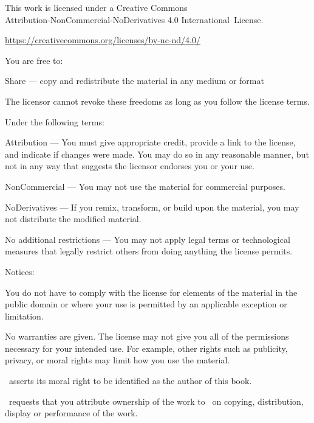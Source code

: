 \clearpage
\thispagestyle{empty}

{\fontsize{8}{12}\selectfont%
\setlength{\parindent}{0pt}%
\raggedright\label{copyright-details}%
\setlength{\parskip}{5pt}%

{\centering

{\LARGE\ccbyncnd}

This work is licensed under a Creative Commons\\
Attribution-NonCommercial-NoDerivatives 4.0 International~License.

\href{https://creativecommons.org/licenses/by-nc-nd/4.0/}{https://creativecommons.org/licenses/by-nc-nd/4.0/}

}

You are free to:

\begin{packeditemize}
\item Share — copy and redistribute the material in any medium or format
\end{packeditemize}

The licensor cannot revoke these freedoms as long as you follow the license terms.

Under the following terms:

\begin{packeditemize}
\item Attribution — You must give appropriate credit, provide a link to the license, and indicate if changes were made. You may do so in any reasonable manner, but not in any way that suggests the licensor endorses you or your use.
\item NonCommercial — You may not use the material for commercial purposes.
\item NoDerivatives — If you remix, transform, or build upon the material, you may not distribute the modified material.
\end{packeditemize}

No additional restrictions — You may not apply legal terms or technological measures that legally restrict others from doing anything the license permits.

\clearpage
\thispagestyle{empty}

Notices:

You do not have to comply with the license for elements of the material in the public domain or where your use is permitted by an applicable exception or limitation.

No warranties are given. The license may not give you all of the permissions necessary for your intended use. For example, other rights such as publicity, privacy, or moral rights may limit how you use the material.

\thePublisher\ asserts its moral right to be identified as the author of this book.

\thePublisher\ requests that you attribute ownership of the work to \thePublisher\ on copying, distribution, display or performance of the work.

}
